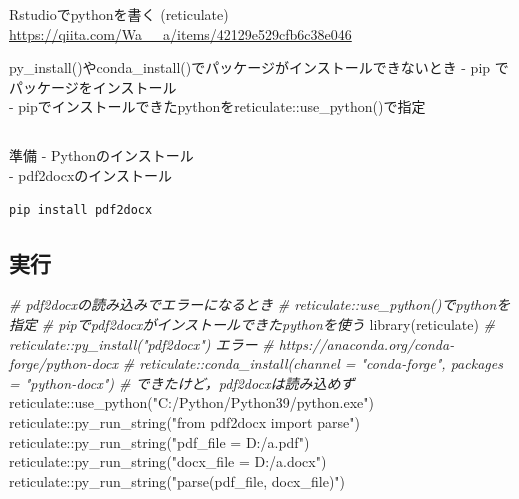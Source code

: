 \documentclass[
]{article}
\newenvironment{Shaded}{\begin{snugshade}}{\end{snugshade}}
\newcommand{\CommentTok}[1]{\textcolor[rgb]{0.56,0.35,0.01}{\textit{#1}}}
\newcommand{\FunctionTok}[1]{\textcolor[rgb]{0.00,0.00,0.00}{#1}}
\newcommand{\NormalTok}[1]{#1}
\newcommand{\SpecialCharTok}[1]{\textcolor[rgb]{0.00,0.00,0.00}{#1}}
\newcommand{\StringTok}[1]{\textcolor[rgb]{0.31,0.60,0.02}{#1}}
\begin{document}
Rstudioでpythonを書く (reticulate)
\url{https://qiita.com/Wa__a/items/42129e529cfb6c38e046}

py\_install()やconda\_install()でパッケージがインストールできないとき
- pip でパッケージをインストール\\
- pipでインストールできたpythonをreticulate::use\_python()で指定

\hypertarget{section-3}{%
\subsection{}\label{section-3}}

準備
- Pythonのインストール\\
- pdf2docxのインストール

\begin{verbatim}
pip install pdf2docx
\end{verbatim}

\hypertarget{ux5b9fux884c}{%
\subsection{実行}\label{ux5b9fux884c}}

\begin{Shaded}
\begin{Highlighting}[]
  \CommentTok{\# pdf2docxの読み込みでエラーになるとき}
  \CommentTok{\#   reticulate::use\_python()でpythonを指定}
  \CommentTok{\#   pipでpdf2docxがインストールできたpythonを使う}
\FunctionTok{library}\NormalTok{(reticulate)}
  \CommentTok{\# reticulate::py\_install("pdf2docx") エラー}
  \CommentTok{\# https://anaconda.org/conda{-}forge/python{-}docx}
  \CommentTok{\# reticulate::conda\_install(channel = "conda{-}forge", packages = "python{-}docx")  \# できたけど，pdf2docxは読み込めず}
\NormalTok{reticulate}\SpecialCharTok{::}\FunctionTok{use\_python}\NormalTok{(}\StringTok{"C:/Python/Python39/python.exe"}\NormalTok{)}
\NormalTok{reticulate}\SpecialCharTok{::}\FunctionTok{py\_run\_string}\NormalTok{(}\StringTok{"from pdf2docx import parse"}\NormalTok{)}
\NormalTok{reticulate}\SpecialCharTok{::}\FunctionTok{py\_run\_string}\NormalTok{(}\StringTok{"pdf\_file = \textquotesingle{}D:/a.pdf\textquotesingle{}"}\NormalTok{)}
\NormalTok{reticulate}\SpecialCharTok{::}\FunctionTok{py\_run\_string}\NormalTok{(}\StringTok{"docx\_file = \textquotesingle{}D:/a.docx\textquotesingle{}"}\NormalTok{)}
\NormalTok{reticulate}\SpecialCharTok{::}\FunctionTok{py\_run\_string}\NormalTok{(}\StringTok{"parse(pdf\_file, docx\_file)"}\NormalTok{)}
\end{Highlighting}
\end{Shaded}
\end{document}
